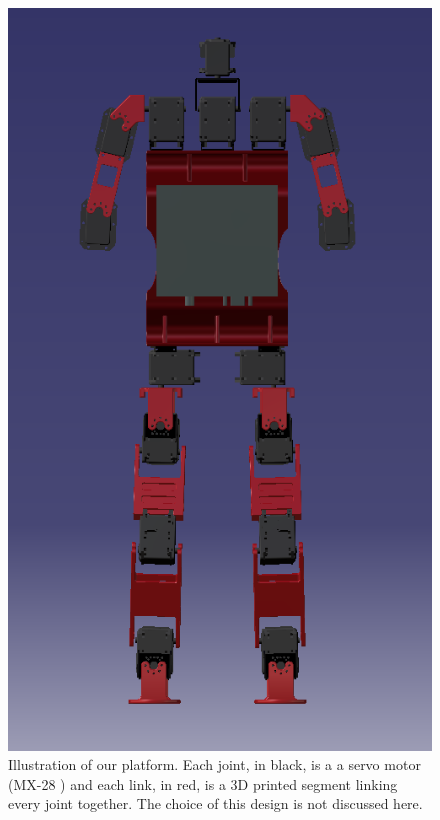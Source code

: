 \documentclass[12pt,a4paper]{report}
\begin{document}
\begin{figure}[h]
  \begin{minipage}[c]{0.3\textwidth}
    \includegraphics[width=\textwidth]{figs/platform.png}
  \end{minipage}\hfill
  \begin{minipage}[c]{0.6\textwidth}
    \caption{Illustration of our platform. Each joint, in black, is a a servo motor (MX-28 \cite{MX28}) and each link, in red, is a 3D printed segment linking every joint together. The choice of this design is not discussed here.}
    \label{fig:platform}
  \end{minipage}
\end{figure}
\end{document}
